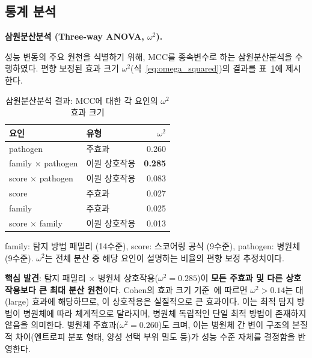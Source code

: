 \subsection{통계 분석}
\label{subsec:9pathogen_statistical}

\textbf{삼원분산분석 (Three-way ANOVA, $\omega^2$).}
\label{subsec:9pathogen_anova}

성능 변동의 주요 원천을 식별하기 위해, MCC를 종속변수로 하는 삼원분산분석을 수행하였다.
편향 보정된 효과 크기 $\omega^2$(식~\ref{eq:omega_squared})의 결과를 표~\ref{tab:9pathogen_anova}에 제시한다.

\begin{table}[htbp]
\centering
\caption{삼원분산분석 결과: MCC에 대한 각 요인의 $\omega^2$ 효과 크기}
\label{tab:9pathogen_anova}
\begin{tabular}{llr}
\toprule
\textbf{요인} & \textbf{유형} & \textbf{$\omega^2$} \\
\midrule
pathogen & 주효과 & 0.260 \\
family $\times$ pathogen & 이원 상호작용 & \textbf{0.285} \\
score $\times$ pathogen & 이원 상호작용 & 0.083 \\
score & 주효과 & 0.027 \\
family & 주효과 & 0.025 \\
score $\times$ family & 이원 상호작용 & 0.013 \\
\bottomrule
\end{tabular}
\begin{minipage}{\textwidth}
\smallskip
\footnotesize family: 탐지 방법 패밀리 (14수준), score: 스코어링 공식 (9수준), pathogen: 병원체 (9수준). $\omega^2$는 전체 분산 중 해당 요인이 설명하는 비율의 편향 보정 추정치이다.
\end{minipage}
\end{table}

\textbf{핵심 발견}: 탐지 패밀리 $\times$ 병원체 상호작용($\omega^2 = 0.285$)이 \textbf{모든 주효과 및 다른 상호작용보다 큰 최대 분산 원천}이다. Cohen의 효과 크기 기준~\cite{cohen1988statistical}에 따르면 $\omega^2 > 0.14$는 대(large) 효과에 해당하므로, 이 상호작용은 실질적으로 큰 효과이다.
이는 최적 탐지 방법이 병원체에 따라 체계적으로 달라지며, 병원체 독립적인 단일 최적 방법이 존재하지 않음을 의미한다.
병원체 주효과($\omega^2 = 0.260$)도 크며, 이는 병원체 간 변이 구조의 본질적 차이(엔트로피 분포 형태, 양성 선택 부위 밀도 등)가 성능 수준 자체를 결정함을 반영한다.

